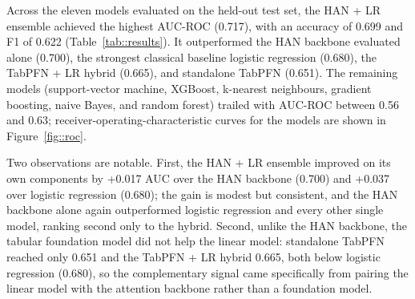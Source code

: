 \documentclass[12pt,a4paper]{article}
\begin{document}
Across the eleven models evaluated on the held-out test set, the HAN + LR ensemble achieved the highest AUC-ROC (0.717), with an accuracy of 0.699 and F1 of 0.622 (Table~\ref{tab::results}). It outperformed the HAN backbone evaluated alone (0.700), the strongest classical baseline logistic regression (0.680), the TabPFN + LR hybrid (0.665), and standalone TabPFN (0.651). The remaining models (support-vector machine, XGBoost, k-nearest neighbours, gradient boosting, naive Bayes, and random forest) trailed with AUC-ROC between 0.56 and 0.63; receiver-operating-characteristic curves for the models are shown in Figure~\ref{fig::roc}.

\begin{table}[H]
\setlength{\abovecaptionskip}{5pt}
\caption{Test-set performance of the eleven evaluated models, ranked by AUC-ROC. Higher is better for all metrics.}
\label{tab::results}
\centering
{}
\end{table}

Two observations are notable. First, the HAN + LR ensemble improved on its own components by +0.017 AUC over the HAN backbone (0.700) and +0.037 over logistic regression (0.680); the gain is modest but consistent, and the HAN backbone alone again outperformed logistic regression and every other single model, ranking second only to the hybrid. Second, unlike the HAN backbone, the tabular foundation model did not help the linear model: standalone TabPFN reached only 0.651 and the TabPFN + LR hybrid 0.665, both below logistic regression (0.680), so the complementary signal came specifically from pairing the linear model with the attention backbone rather than a foundation model.
\end{document}
